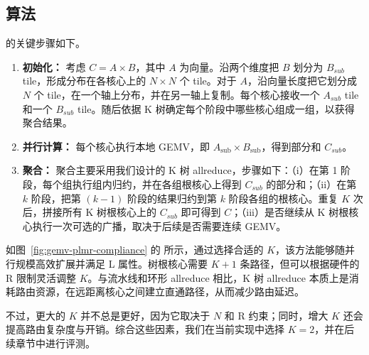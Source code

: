 \vspace{-3mm}
\subsection{\gemv 算法}
\vspace{-1mm}

\gemv 的关键步骤如下。

\begin{enumerate}[label=(\arabic*),leftmargin=0.5cm,noitemsep,topsep=0pt]
\item \textbf{初始化：} 考虑 $C=A\times B$，其中 $A$ 为向量。\gemv 沿两个维度把 $B$ 划分为 $B_{sub}$ tile，形成分布在各核心上的 $N\times N$ 个 tile。对于 $A$，\gemv 沿向量长度把它划分成 $N$ 个 tile，在一个轴上分布，并在另一轴上复制。每个核心接收一个 $A_{sub}$ tile 和一个 $B_{sub}$ tile。随后依据 K 树确定每个阶段中哪些核心组成一组，以获得聚合结果。

\item \textbf{并行计算：} 每个核心执行本地 GEMV，即 $A_{\text{sub}}\times B_{\text{sub}}$，得到部分和 $C_{sub}$。

\item \textbf{聚合：} 聚合主要采用我们设计的 K 树 allreduce，步骤如下：（i）在第 1 阶段，每个组执行组内归约，并在各组根核心上得到 $C_{sub}$ 的部分和；（ii）在第 $k$ 阶段，把第 $(k-1)$ 阶段的结果归约到第 $k$ 阶段各组的根核心。重复 $K$ 次后，拼接所有 K 树根核心上的 $C_{sub}$ 即可得到 $C$；（iii）是否继续从 K 树根核心执行一次可选的广播，取决于后续是否需要连续 GEMV。
\end{enumerate}

如图~\ref{fig:gemv-plmr-compliance} 的  所示，通过选择合适的 $K$，该方法能够随并行规模高效扩展并满足 L 属性。树根核心需要 $K+1$ 条路径，但可以根据硬件的 R 限制灵活调整 $K$。与流水线和环形 allreduce 相比，K 树 allreduce 本质上是消耗路由资源，在远距离核心之间建立直通路径，从而减少路由延迟。

不过，更大的 $K$ 并不总是更好，因为它取决于 $N$ 和 R 约束；同时，增大 $K$ 还会提高路由复杂度与开销。综合这些因素，我们在当前实现中选择 $K=2$，并在后续章节中进行评测。
